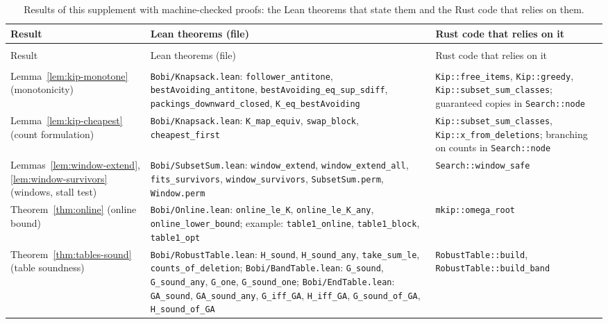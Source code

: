 {\footnotesize
\setlength{\tabcolsep}{4pt}\setlength{\LTcapwidth}{\linewidth}
\begin{longtable}{@{}>{\raggedright\arraybackslash}p{1.3in}>{\raggedright\arraybackslash}p{2.75in}>{\raggedright\arraybackslash}p{2.0in}@{}}
\caption{Results of this supplement with machine-checked proofs: the Lean
theorems that state them and the Rust code that relies on them.}\label{tab:lean-map}\tabularnewline
\toprule
Result & Lean theorems (file) & Rust code that relies on it\tabularnewline
\midrule
\endfirsthead
\multicolumn{3}{@{}l}{\emph{(continued)}}\tabularnewline
\toprule
Result & Lean theorems (file) & Rust code that relies on it\tabularnewline
\midrule
\endhead
\bottomrule
\endlastfoot
\multicolumn{3}{@{}l}{\emph{Knapsack interdiction (Section~\ref{app:kip})}}\tabularnewline[3pt]
Lemma~\ref{lem:kip-monotone} (monotonicity) &
\texttt{Bobi/Knapsack.lean}: \texttt{follower\_antitone}, \texttt{bestAvoiding\_antitone}, \texttt{bestAvoiding\_eq\_sup\_sdiff}, \texttt{packings\_downward\_closed}, \texttt{K\_eq\_bestAvoiding} &
\texttt{Kip::free\_items}, \texttt{Kip::greedy}, \texttt{Kip::subset\_sum\_classes}; guaranteed copies in \texttt{Search::node}\tabularnewline[3pt]
Lemma~\ref{lem:kip-cheapest} (count formulation) &
\texttt{Bobi/Knapsack.lean}: \texttt{K\_map\_equiv}, \texttt{swap\_block}, \texttt{cheapest\_first} &
\texttt{Kip::subset\_sum\_classes}, \texttt{Kip::x\_from\_deletions}; branching on counts in \texttt{Search::node}\tabularnewline[3pt]
Lemmas~\ref{lem:window-extend}, \ref{lem:window-survivors} (windows, stall test) &
\texttt{Bobi/SubsetSum.lean}: \texttt{window\_extend}, \texttt{window\_extend\_all}, \texttt{fits\_survivors}, \texttt{window\_survivors}, \texttt{SubsetSum.perm}, \texttt{Window.perm} &
\texttt{Search::window\_safe}\tabularnewline[3pt]
Theorem~\ref{thm:online} (online bound) &
\texttt{Bobi/Online.lean}: \texttt{online\_le\_K}, \texttt{online\_le\_K\_any}, \texttt{online\_lower\_bound}; example: \texttt{table1\_online}, \texttt{table1\_block}, \texttt{table1\_opt} &
\texttt{mkip::omega\_root}\tabularnewline[3pt]
Theorem~\ref{thm:tables-sound} (table soundness) &
\texttt{Bobi/RobustTable.lean}: \texttt{H\_sound}, \texttt{H\_sound\_any}, \texttt{take\_sum\_le}, \texttt{counts\_of\_deletion}; \texttt{Bobi/BandTable.lean}: \texttt{G\_sound}, \texttt{G\_sound\_any}, \texttt{G\_one}, \texttt{G\_sound\_one}; \texttt{Bobi/EndTable.lean}: \texttt{GA\_sound}, \texttt{GA\_sound\_any}, \texttt{G\_iff\_GA}, \texttt{H\_iff\_GA}, \texttt{G\_sound\_of\_GA}, \texttt{H\_sound\_of\_GA} &
\texttt{RobustTable::build}, \texttt{RobustTable::build\_band}\tabularnewline[3pt]

\end{longtable}}
